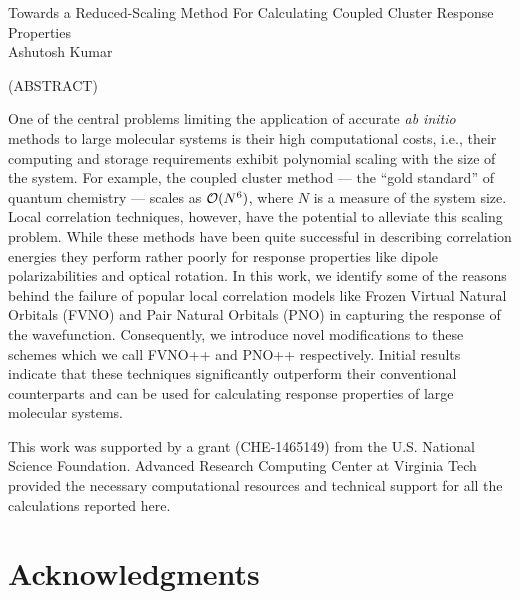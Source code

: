 \documentclass[12pt]{report}
\begin{document}
\thispagestyle{empty}
\begin{center}

{\Large
Towards a Reduced-Scaling Method For Calculating Coupled Cluster Response Properties 
}\\

\vspace{8em}
Ashutosh Kumar
\vspace{8em}


(ABSTRACT)


\end{center}
One of the central problems limiting the application of accurate {\em ab
initio} methods to large molecular systems is their high computational costs,
i.e., their computing and storage requirements exhibit polynomial scaling with
the size of the system.  For example, the coupled cluster method --- the
``gold standard'' of quantum chemistry --- scales as ${\cal O}(N^6)$, where
$N$ is a measure of the system size. Local correlation techniques, however, have 
the potential to alleviate this scaling problem. While these methods have been
quite successful in describing correlation energies they perform rather poorly 
for response properties like dipole polarizabilities and optical rotation. In 
this work, we identify some of the reasons behind the failure of popular
local correlation models like Frozen Virtual Natural Orbitals (FVNO) and Pair Natural
Orbitals (PNO) in capturing the response of the wavefunction. Consequently, we introduce 
novel modifications to these schemes which we call FVNO++ and PNO++ respectively.
Initial results indicate that these techniques significantly outperform their 
conventional counterparts and can be used for calculating response properties 
of large molecular systems.

\vfill
This work was supported by a grant (CHE-1465149) from
the U.S. National Science Foundation. Advanced Research Computing 
Center at Virginia Tech provided the necessary computational resources and technical 
support for all the calculations reported here.

\pagebreak

\chapter*{Acknowledgments}
\end{document}
